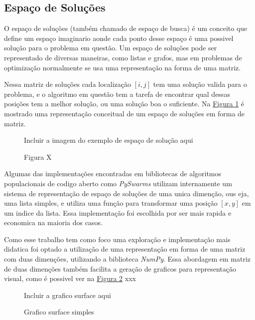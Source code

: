     \subsection{Espaço de Soluções}
        O espaço de soluções (também chamado de espaço de busca) é um conceito que define um espaço imaginario aonde cada ponto desse espaço é uma possivel solução para o problema em questão. Um espaço de soluções pode ser representado de diversas maneiras, como listas e grafos, mas em problemas de optimização normalmente se usa uma representação na forma de uma matriz.\newline
        
        Nessa matriz de soluções cada localização $[i, j]$ tem uma solução valida para o problema, e o algoritmo em questão tem a tarefa de encontrar qual dessas posições tem a melhor solução, ou uma solução boa o suficiente. Na 
        \hyperref[fig:solution-space]{Figura \ref{fig:solution-space}} 
        é mostrado uma representação conceitual de um espaço de soluções em forma de matriz.\newline
        
        \begin{figure}[h]
            \centering
            \small{Incluir a imagem do exemplo de espaço de solução aqui}
            \caption{Figura X}
            \label{fig:solution-space}
        \end{figure}


        Algumas das implementações encontradas em bibliotecas de algoritmos populacionais de codigo aberto como \textit{PySwarms} utilizam internamente um sistema de representação de espaço de soluções de uma unica dimenção, ous eja, uma lista simples, e utiliza uma função para transformar uma posição $[x,y]$ em um indice da lista. Essa implementação foi escolhida por ser mais rapida e economica na maioria dos casos. \newline

        Como esse trabalho tem como foco uma exploração e implementação mais didatica foi optado a utilização de uma representação em forma de uma matriz com duas dimenções, utilizando a biblioteca \textit{NumPy}. Essa abordagem em matriz de duas dimenções também facilita a geração de graficos para representação visual, como é possivel ver na 
        \hyperref[fig:surfaceplot]{Figura \ref{fig:surfaceplot}} 
        xxx

        
        \begin{figure}[h]
            \centering
            \small{Incluir a grafico surface aqui}
            \caption{Grafico surface simples}
            \label{fig:surfaceplot}
        \end{figure}
        

